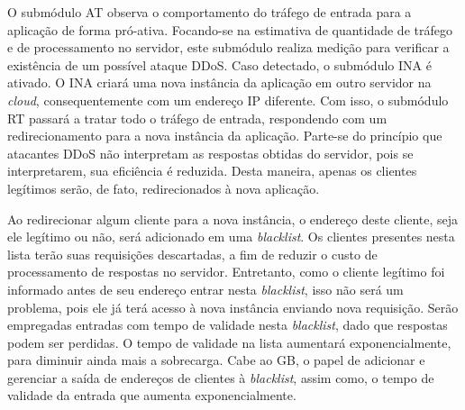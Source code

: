 O submódulo AT observa o comportamento do tráfego de entrada para a aplicação de forma pró-ativa. Focando-se na estimativa de quantidade de tráfego e de processamento no servidor, este submódulo realiza medição para verificar a existência de um possível ataque DDoS. Caso detectado, o submódulo INA é ativado. O INA criará uma nova instância da aplicação em outro servidor na \emph{cloud}, consequentemente com um endereço IP diferente.%
 Com isso, o submódulo RT passará a tratar todo o tráfego de entrada, respondendo com um redirecionamento para a nova instância da aplicação. Parte-se do princípio que atacantes DDoS não interpretam as respostas obtidas do servidor, pois se interpretarem, sua eficiência é reduzida. Desta maneira, apenas os clientes legítimos serão, de fato, redirecionados à nova aplicação.

Ao redirecionar algum cliente para a nova instância, o endereço deste cliente, seja ele legítimo ou não, será adicionado em uma \emph{blacklist}. Os clientes presentes nesta lista terão suas requisições descartadas, a fim de reduzir o custo de processamento de respostas no servidor. Entretanto, como o cliente legítimo foi informado antes de seu endereço entrar nesta \emph{blacklist}, isso não será um problema, pois ele já terá acesso à nova instância enviando nova requisição. Serão empregadas entradas com tempo de validade nesta \emph{blacklist}, dado que respostas podem ser perdidas. O tempo de validade na lista aumentará exponencialmente, para diminuir ainda mais a sobrecarga. Cabe ao GB, o papel de adicionar e gerenciar a saída de endereços de clientes à \emph{blacklist}, assim como, o tempo de validade da entrada que aumenta exponencialmente.


